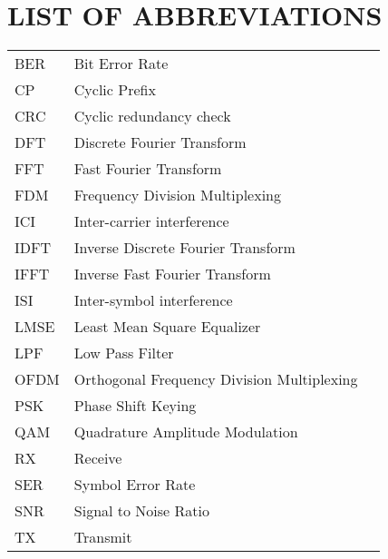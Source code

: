 \section*{LIST OF ABBREVIATIONS}

\begin{tabularx}{0.9\textwidth}{ L{0.4} L{1.3} L{1.3} }
    BER     & Bit Error Rate \\ %
    CP      & Cyclic Prefix \\ %
    CRC     & Cyclic redundancy check \\
    DFT     & Discrete Fourier Transform \\
    FFT     & Fast Fourier Transform \\
    FDM     & Frequency Division Multiplexing \\ %
    ICI     & Inter-carrier interference \\ %
    IDFT    & Inverse Discrete Fourier Transform \\
    IFFT    & Inverse Fast Fourier Transform \\
    ISI     & Inter-symbol interference \\ %
    LMSE    & Least Mean Square Equalizer \\ %
    LPF     & Low Pass Filter \\
    OFDM    & Orthogonal Frequency Division Multiplexing \\ %
    PSK     & Phase Shift Keying \\ %
    QAM     & Quadrature Amplitude Modulation \\ %
    RX      & Receive \\
    SER     & Symbol Error Rate \\ %
    SNR     & Signal to Noise Ratio \\ %
    TX      & Transmit \\
\end{tabularx}

\newpage